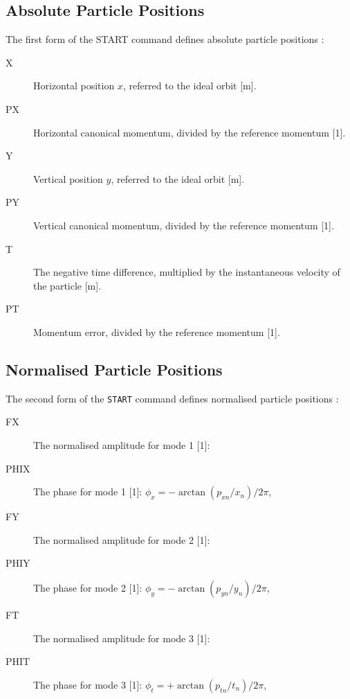 \subsection{Absolute Particle Positions}
The first form of the {START} command  defines
absolute particle positions :
\begin{description}
\item[X]
  Horizontal position $x$, referred to the ideal orbit [m].
\item[PX]
  Horizontal canonical momentum, divided by the reference momentum [1].
\item[Y]
  Vertical position $y$, referred to the ideal orbit [m].
\item[PY]
  Vertical canonical momentum, divided by the reference momentum [1].
\item[T]
  The negative time difference,
  multiplied by the instantaneous velocity of the particle [m].
\item[PT]
  Momentum error, divided by the reference momentum [1].
\end{description}

\subsection{Normalised Particle Positions}
The second form of the \texttt{START} command defines
normalised particle positions :
\begin{description}
\item[FX]
  The normalised amplitude for mode 1 [1]:
\item[PHIX]
  The phase for mode 1 [1]:
  $\phi_x = - \arctan(p_{xn}/x_n) / 2 \pi$,
\item[FY]
  The normalised amplitude for mode 2 [1]:
\item[PHIY]
  The phase for mode 2 [1]:
  $\phi_y = - \arctan(p_{yn}/y_n) / 2 \pi$,
\item[FT]
  The normalised amplitude for mode 3 [1]:
\item[PHIT]
  The phase for mode 3 [1]:
  $\phi_t = + \arctan(p_{tn}/t_n) / 2 \pi$,
\end{description}

